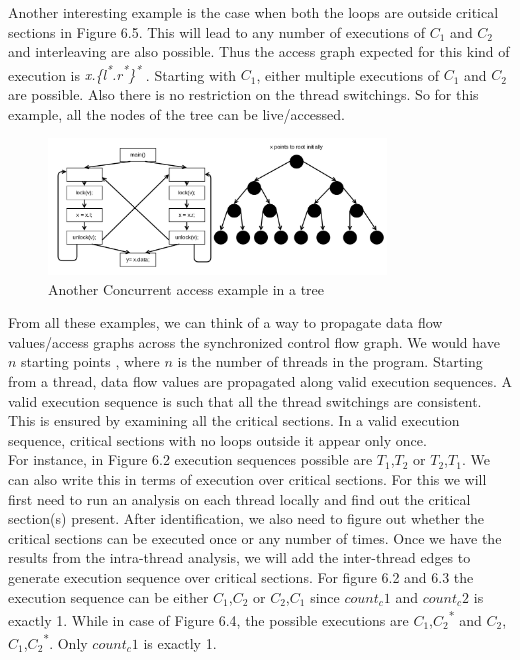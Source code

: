 Another interesting example is the case when both the loops are outside critical sections in Figure 6.5. This will lead to any number of executions of $C_1$ and $C_2$ and interleaving are also possible. Thus the access graph expected for this kind of execution is \emph{x.\{l\textsuperscript{*}.r\textsuperscript{*}\}\textsuperscript{*}} . Starting with $C_1$, either multiple executions of $C_1$ and $C_2$ are possible. Also there is no restriction on the thread switchings. So for this example, all the nodes of the tree can be live/accessed. \\

\begin{figure}
	\centering
	\includegraphics[width=0.8\textwidth]{Figures/tree4.png}
	\caption{Another Concurrent access example in a tree}
	\label{fig:ch5example}
 
\end{figure}

From all these examples, we can think of a way to propagate data flow values/access graphs across the synchronized control flow graph. We would have $n$ starting points , where $n$ is the number of threads in the program. Starting from a thread, data flow values are propagated along valid execution sequences. A valid execution sequence is such that all the thread switchings are consistent. This is ensured by examining all the critical sections. In a valid execution sequence, critical sections with no loops outside it appear only once. \\

For instance, in Figure 6.2 execution sequences possible are $T_1$,$T_2$ or $T_2$,$T_1$. We can also write this in terms of execution over critical sections. For this we will first need to run an analysis on each thread locally and find out the critical section(s) present. After identification, we also need to figure out whether the critical sections can be executed once or any number of times. Once we have the results from the intra-thread analysis, we will add the inter-thread edges to generate execution sequence over critical sections. For figure 6.2 and 6.3 the execution sequence can be either $C_1$,$C_2$ or $C_2$,$C_1$ since $count_c1$ and $count_c2$ is exactly 1. While in case of Figure 6.4, the possible executions are $C_1$,$C_2$\textsuperscript{*} and $C_2$,$C_1$,$C_2$\textsuperscript{*}. Only $count_c1$ is exactly 1.  \\


